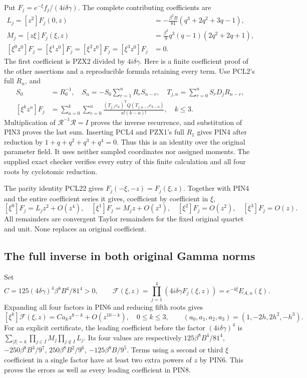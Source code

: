 Put $F_j=e^{-\xi}f_j/(4i\delta\gamma)$. The complete contributing
coefficients are
\[
 \begin{split}
 L_j=[z^2]F_j(0,z)&=-\frac{\beta^2B}{81}
                         (q^3+2q^2+3q-1),\\
 M_j=[z\xi]F_j(\xi,z)&=\frac{\beta^2}{9}
                         q^3(q-1)(2q^2+2q+1),\\
 [\xi^0z^0]F_j=[\xi^1z^0]F_j
   =[\xi^2z^0]F_j=[\xi^3z^0]F_j&=0.
 \end{split}\tag{PIN4}
\]
The first coefficient is PZX2 divided by $4i\delta\gamma$.
Here is a finite coefficient proof of the other assertions and a
reproducible formula retaining every term. Use PCL2's full $R_n$, and
\[
 \begin{aligned}
 S_0&=R_0^{-1},\quad
 S_n=-S_0\sum_{r=1}^nR_rS_{n-r},\quad
 T_{j,n}=\sum_{r=0}^n S_rD_jR_{n-r},\\
 [\xi^kz^n]F_j&=
 \sum_{a=0}^k\sum_{r=0}^n
 \frac{(T_{j,r}e_a)^{\mathsf T}Q(T_{j,n-r}e_{k-a})}
      {a!(k-a)!},\quad k\le3.
 \end{aligned}
 \tag{PIN5}
\]
Multiplication of $\mathcal R^{-1}\mathcal R=I$ proves the inverse
recurrence, and substitution of PIN3 proves the last sum. Inserting
PCL4 and PZX1's full $R_1$ gives PIN4 after reduction by
$1+q+q^2+q^3+q^4=0$. Thus this is an identity over the original
parameter field. It uses neither sampled coordinates nor assigned
moments. The supplied exact checker verifies every entry of this
finite calculation and all four roots by cyclotomic reduction.

The parity identity PCL22 gives
$F_j(-\xi,-z)=F_j(\xi,z)$. Together with PIN4 and the entire
coefficient series it gives, coefficient by coefficient in $\xi$,
\[
 [\xi^0]F_j=L_jz^2+O(z^4),\quad
 [\xi^1]F_j=M_jz+O(z^3),\quad
 [\xi^2]F_j=O(z^2),\quad [\xi^3]F_j=O(z).
 \tag{PIN6}
\]
All remainders are convergent Taylor remainders for the fixed original
quartet and unit. None replaces an original coefficient.

\subsection{The full inverse in both original Gamma norms}
Set
\[
 C=125(4\delta\gamma)^4\beta^8B^4/81^4>0,\qquad
 \mathcal F(\xi,z)=\prod_{j=1}^4(4i\delta\gamma F_j(\xi,z))
                         =e^{-4\xi}E_{A,u}(\xi).
 \tag{PIN7}
\]
Expanding all four factors in PIN6 and reducing fifth roots gives
\[
 [\xi^k]\mathcal F(\xi,z)
 =C a_kz^{8-k}+O(z^{10-k}),\quad 0\le k\le3,
 \qquad (a_0,a_1,a_2,a_3)=(1,-2h,2h^2,-h^3).
 \tag{PIN8}
\]
For an explicit certificate, the leading coefficient before the
factor $(4i\delta\gamma)^4$ is
$\sum_{|I|=k}\prod_{j\in I}M_j\prod_{j\notin I}L_j$.
Its four values are respectively
$125\beta^8B^4/81^4$,
$-250\beta^8B^3/9^7$,
$250\beta^8B^2/9^6$,
$-125\beta^8B/9^5$.
Terms using a second or third $\xi$ coefficient in a single factor
have at least two extra powers of $z$ by PIN6. This proves the errors
as well as every leading coefficient in PIN8.

